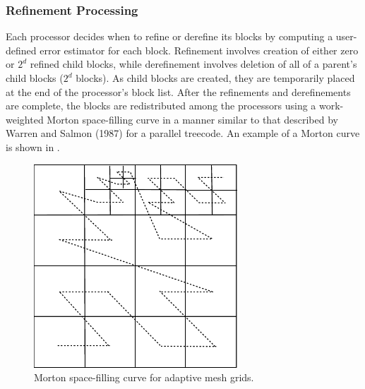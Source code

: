 


\subsubsection{Refinement Processing}
Each processor decides when to refine or derefine its blocks by
computing a user-defined error estimator for each block. Refinement
involves creation of either zero or $2^d$ refined child blocks,
while derefinement involves deletion of all of a parent's child
blocks ($2^d$ blocks). As child blocks are created, they are
temporarily placed at the end of the processor's block list. After
the refinements and derefinements are complete, the blocks are
redistributed among the processors using a work-weighted Morton
space-filling curve in a manner similar to that described by Warren
and Salmon (1987) for a parallel treecode. An example of a Morton
curve is shown in .

\begin{figure}
\begin{center}
\includegraphics[width=3in]{Grid_f3}
\caption{\label{Fig:f3}
        Morton space-filling curve for adaptive mesh grids.}
\end{center}
\end{figure}

